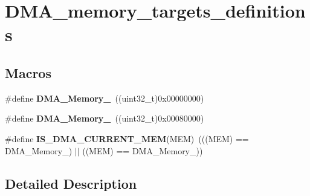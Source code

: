 \hypertarget{group___d_m_a__memory__targets__definitions}{}\section{D\+M\+A\+\_\+memory\+\_\+targets\+\_\+definitions}
\label{group___d_m_a__memory__targets__definitions}
\subsection*{Macros}
\begin{DoxyCompactItemize}
\item 
\hypertarget{group___d_m_a__memory__targets__definitions_gadb576bccef5f2fc65fe9b451033bdc95}{}\#define {\bfseries D\+M\+A\+\_\+\+Memory\+\_}~((uint32\+\_\+t)0x00000000)\label{group___d_m_a__memory__targets__definitions_gadb576bccef5f2fc65fe9b451033bdc95}

\item 
\hypertarget{group___d_m_a__memory__targets__definitions_ga6d1e13631e4ef9a013d078e613fd7fd5}{}\#define {\bfseries D\+M\+A\+\_\+\+Memory\+\_}~((uint32\+\_\+t)0x00080000)\label{group___d_m_a__memory__targets__definitions_ga6d1e13631e4ef9a013d078e613fd7fd5}

\item 
\hypertarget{group___d_m_a__memory__targets__definitions_ga87d6abab18d2b4bb86db909854cc1f02}{}\#define {\bfseries I\+S\+\_\+\+D\+M\+A\+\_\+\+C\+U\+R\+R\+E\+N\+T\+\_\+\+M\+E\+M}(M\+E\+M)~(((M\+E\+M) == D\+M\+A\+\_\+\+Memory\+\_) $\vert$$\vert$ ((M\+E\+M) == D\+M\+A\+\_\+\+Memory\+\_))\label{group___d_m_a__memory__targets__definitions_ga87d6abab18d2b4bb86db909854cc1f02}

\end{DoxyCompactItemize}


\subsection{Detailed Description}
